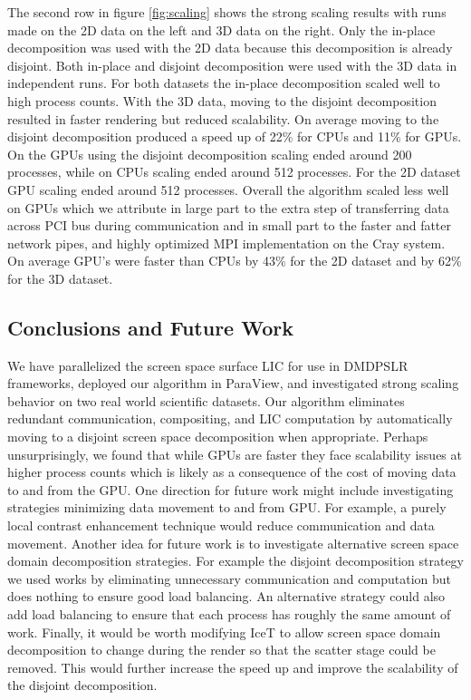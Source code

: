 \documentclass[a4paper,10pt]{article}
\begin{document}
The second row in figure \ref{fig:scaling} shows the strong scaling results with runs made on the 2D data on the left and 3D data on the right. Only the in-place decomposition was used with the 2D data because this decomposition is already disjoint. Both in-place and disjoint decomposition were used with the 3D data in independent runs. For both datasets the in-place decomposition scaled well to high process counts. With the 3D data, moving to the disjoint decomposition resulted in faster rendering but reduced scalability. On average moving to the disjoint decomposition produced a speed up of 22\% for CPUs and 11\% for GPUs. On the GPUs using the disjoint decomposition scaling ended around 200 processes, while on CPUs scaling ended around 512 processes. For the 2D dataset GPU scaling ended around 512 processes. Overall the algorithm scaled less well on GPUs which we attribute in large part to the extra step of transferring data across PCI bus during communication and in small part to the faster and fatter network pipes, and highly optimized MPI implementation on the Cray system. On average GPU's were faster than CPUs by 43\% for the 2D dataset and by 62\% for the 3D dataset.

\subsection{Conclusions and Future Work}
We have parallelized the screen space surface LIC for use in DMDPSLR frameworks, deployed our algorithm in ParaView, and investigated strong scaling behavior on two real world scientific datasets. Our algorithm eliminates redundant communication, compositing, and LIC computation by automatically moving to a disjoint screen space decomposition when appropriate. Perhaps unsurprisingly, we found that while GPUs are faster they face scalability issues at higher process counts which is likely as a consequence of the cost of moving data to and from the GPU. One direction for future work might include investigating strategies minimizing data movement to and from GPU. For example, a purely local contrast enhancement technique would reduce communication and data movement. Another idea for future work is to investigate alternative screen space domain decomposition strategies. For example the disjoint decomposition strategy we used works by eliminating unnecessary communication and computation but does nothing to ensure good load balancing. An alternative strategy could also add load balancing to ensure that each process has roughly the same amount of work. Finally, it would be worth modifying IceT to allow screen space domain decomposition to change during the render so that the scatter stage could be removed. This would further increase the speed up and improve the scalability of the disjoint decomposition.
\vspace{-0.01in}

\end{document}
